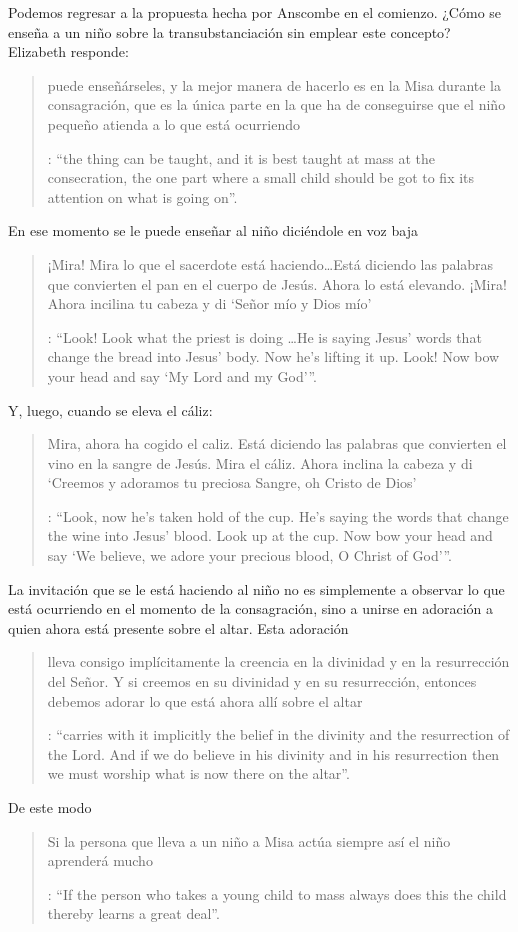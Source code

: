 Podemos regresar a la propuesta hecha por Anscombe en el comienzo. ¿Cómo se enseña a un niño sobre la transubstanciación sin emplear este concepto? Elizabeth responde: \blockquote[
{\Cite[107]{anscombe1981erp:ot}}: \enquote{the thing can be taught, and it is best taught at mass at the consecration, the one part where a small child should be got to fix its attention on what is going on}.
]{puede enseñárseles, y la mejor manera de hacerlo es en la Misa durante la consagración, que es la única parte en la que ha de conseguirse que el niño pequeño atienda a lo que está ocurriendo}. En ese momento se le puede enseñar al niño diciéndole en voz baja \blockquote[
{\Cite[107]{anscombe1981erp:ot}}: \enquote{Look! Look what the priest is doing \ldots He is saying Jesus' words that change the bread into Jesus' body. Now he's lifting it up. Look! Now bow your head and say `My Lord and my God'}.
]{¡Mira! Mira lo que el sacerdote está haciendo\ldots  Está diciendo las palabras que convierten el pan en el cuerpo de Jesús. Ahora lo está elevando. ¡Mira! Ahora incilina tu cabeza y di `Señor mío y Dios mío'}. Y, luego, cuando se eleva el cáliz: \blockquote[
{\Cite[107]{anscombe1981erp:ot}}: \enquote{Look, now he's taken hold of the cup. He's saying the words that change the wine into Jesus' blood. Look up at the cup. Now bow your head and say `We believe, we adore your precious blood, O Christ of God'}.
]{Mira, ahora ha cogido el caliz. Está diciendo las palabras que convierten el vino en la sangre de Jesús. Mira el cáliz. Ahora inclina la cabeza y di `Creemos y adoramos tu preciosa Sangre, oh Cristo de Dios'}.

La invitación que se le está haciendo al niño no es simplemente a observar lo que está ocurriendo en el momento de la consagración, sino a unirse en adoración a quien ahora está presente sobre el altar. Esta adoración \blockquote[
{\Cite[107]{anscombe1981erp:ot}}: \enquote{carries with it implicitly the belief in the divinity and the resurrection of the Lord. And if we do believe in his divinity and in his resurrection then we must worship what is now there on the altar}.
]{lleva consigo implícitamente la creencia en la divinidad y en la resurrección del Señor. Y si creemos en su divinidad y en su resurrección, entonces debemos adorar lo que está ahora allí sobre el altar}. De este modo \blockquote[
{\Cite[107]{anscombe1981erp:ot}}: \enquote{If the person who takes a young child to mass always does this \textelp{} the child thereby learns a great deal}.
]{Si la persona que lleva a un niño a Misa actúa siempre así \textelp{} el niño aprenderá mucho}.

